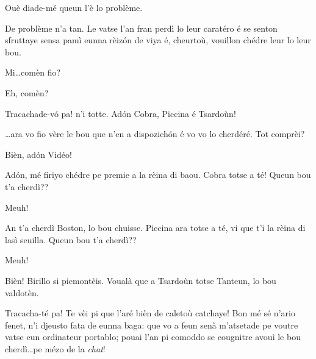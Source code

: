 \begin{drama}
\Cienspeaks {} Ouè diade-mé queun l’è lo problème.

\Schulzspeaks De problème n’a tan. Le vatse l’an fran perdì lo leur caratéro é se senton sfruttaye sensa pamì eunna rèiz\'on de viya é, cheurtoù, vouillon chédre leur lo leur bou.

\Cienspeaks Mi\ldots comèn fio?

\Mariettospeaks{} Eh, comèn?

\Schulzspeaks Tracachade-v\'o pa! n’i totte. Ad\'on   Cobra, Piccina é Tsardoùn!


\Schulzspeaks\ldots ara vo fio vère le bou que n’en a dispozich\'on é vo vo lo cherdéré. Tot comprèi?


\Schulzspeaks Bièn, ad\'on Vidéo!



\Schulzspeaks Ad\'on, mé firiyo chédre pe premie a la rèina di baou. Cobra totse a té! Queun bou t'a cherdì??

\Cobraspeaks{} Meuh!

\Schulzspeaks An t’a cherdì Boston, lo bou chuisse. Piccina ara totse a té, vi que t’i la rèina di lasì seuilla. Queun bou t'a cherdì??

\Piccinaspeaks{} Meuh!

\Schulzspeaks Bièn! Birillo si piemontèis. Voualà que a Tsardoùn totse Tanteun, lo bou valdotèn.


\Schulzspeaks{} Tracacha-té pa! Te vèi pi que l'aré bièn de caletoù catchaye!  Bon mé sé n'ario fenet, n'i djeusto fata de eunna baga: que vo a feun senà m'atsetade pe voutre vatse eun ordinateur portablo; pouai l'an pi comoddo se cougnitre avouì le bou cherdì\ldots pe mézo de la \textit{chat}!


\end{drama}

